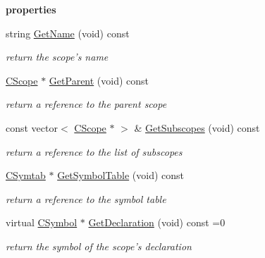 \begin{Indent}{\bf properties}\par
\begin{DoxyCompactItemize}
\item 
\hypertarget{classCScope_ad4374438ec6463f3b60e47deb2a06c18}{string \hyperlink{classCScope_ad4374438ec6463f3b60e47deb2a06c18}{Get\-Name} (void) const }\label{classCScope_ad4374438ec6463f3b60e47deb2a06c18}

\begin{DoxyCompactList}\small\item\em return the scope's name \end{DoxyCompactList}\item 
\hypertarget{classCScope_a9ad71c794f0b90bfcfac8d37a631f014}{\hyperlink{classCScope}{C\-Scope} $\ast$ \hyperlink{classCScope_a9ad71c794f0b90bfcfac8d37a631f014}{Get\-Parent} (void) const }\label{classCScope_a9ad71c794f0b90bfcfac8d37a631f014}

\begin{DoxyCompactList}\small\item\em return a reference to the parent scope \end{DoxyCompactList}\item 
\hypertarget{classCScope_a96d7dbacc2538a8a350b543705aa6a07}{const vector$<$ \hyperlink{classCScope}{C\-Scope} $\ast$ $>$ \& \hyperlink{classCScope_a96d7dbacc2538a8a350b543705aa6a07}{Get\-Subscopes} (void) const }\label{classCScope_a96d7dbacc2538a8a350b543705aa6a07}

\begin{DoxyCompactList}\small\item\em return a reference to the list of subscopes \end{DoxyCompactList}\item 
\hypertarget{classCScope_a029745331327478de186edfd91300a59}{\hyperlink{classCSymtab}{C\-Symtab} $\ast$ \hyperlink{classCScope_a029745331327478de186edfd91300a59}{Get\-Symbol\-Table} (void) const }\label{classCScope_a029745331327478de186edfd91300a59}

\begin{DoxyCompactList}\small\item\em return a reference to the symbol table \end{DoxyCompactList}\item 
virtual \hyperlink{classCSymbol}{C\-Symbol} $\ast$ \hyperlink{classCScope_a4fefc7bc67cc7fdfc86df2dbd53994de}{Get\-Declaration} (void) const =0
\begin{DoxyCompactList}\small\item\em return the symbol of the scope's declaration \end{DoxyCompactList}\end{DoxyCompactItemize}
\end{Indent}
